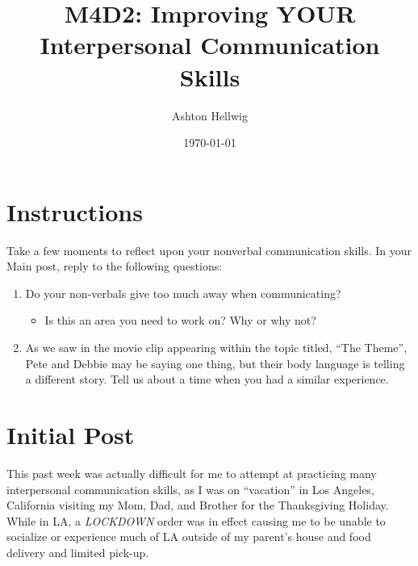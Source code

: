 \documentclass[stu,12pt]{apa7}
\title{%
    M4D2: Improving YOUR Interpersonal Communication Skills
  }
\author{Ashton Hellwig}
\date{\today}
\begin{document}
  \maketitle


  \section*{Instructions}
    Take a few moments to reflect upon your nonverbal communication skills.
      In your Main post, reply to the following questions:

    \begin{enumerate}
      \item Do your non-verbals give too much away when communicating?
      \begin{itemize}
        \item Is this an area you need to work on? Why or why not?
      \end{itemize}
      \item As we saw in the movie clip appearing within the topic titled,
        ``The Theme'', Pete and Debbie may be saying one thing, but their body
        language is telling a different story. Tell us about a time when you had
        a similar experience.
    \end{enumerate}


  \newpage
  \section{Initial Post}
    This past week was actually difficult for me to attempt at practicing
      many interpersonal communication skills, as I was on ``vacation'' in
      Los Angeles, California visiting my Mom, Dad, and Brother for the
      Thanksgiving Holiday. While in LA, a \textit{LOCKDOWN} order was in effect
      causing me to be unable to socialize or experience much of LA outside of
      my parent's house and food delivery and limited pick-up.


\end{document}
